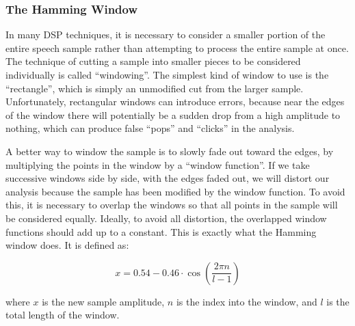 \subsubsection{The Hamming Window}

In many DSP techniques, it is necessary to consider a smaller portion of the
entire speech sample rather than attempting to process the entire sample at
once.  The technique of cutting a sample into smaller pieces to be considered
individually is called ``windowing''.  The simplest kind of window to use is
the ``rectangle'', which is simply an unmodified cut from the larger sample.
Unfortunately, rectangular windows can introduce errors, because near the edges
of the window there will potentially be a sudden drop from a high amplitude
to nothing, which can produce false ``pops'' and ``clicks'' in the analysis.

A better way to window the sample is to slowly fade out toward the edges, by
multiplying the points in the window by a ``window function''.  If we take
successive windows side by side, with the edges faded out, we will distort
our analysis because the sample has been modified by the window function.
To avoid this, it is necessary to overlap the windows so that all points in
the sample will be considered equally.  Ideally, to avoid all distortion, the
overlapped window functions should add up to a constant.  This is exactly what
the Hamming window does.  It is defined as:

$$ x = 0.54 - 0.46 \cdot \cos\left(\frac{2 \pi n}{l-1}\right) $$

\noindent
where $x$ is the new sample amplitude, $n$ is the index into the window, and $l$ is
the total length of the window.
